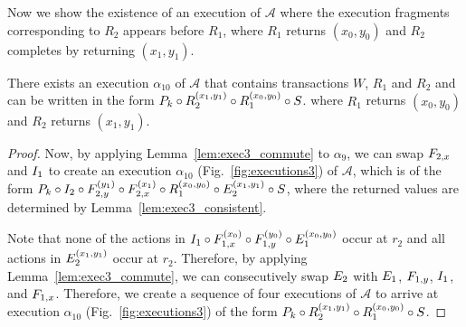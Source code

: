 
Now we show the existence of an execution of $\mathcal{A}$ where the execution fragments corresponding to $R_2$ appears 
before $R_1$, where  $R_1$ returns $(x_0, y_0)$ and $R_2$ completes by returning $(x_1, y_1)$.
\begin{lemma}   \label{lem:exec3_alpha11} 
\sloppy There exists an execution $\alpha_{10}$  of $\mathcal{A}$ that contains transactions $W$, $R_1$ and $R_2$
and   can be written in the form 
$\finiteprefixA{k-1}{k}   \circ
\frage{R_2}{}{x_1, y_1} \circ
 \frage{R_1}{}{x_0, y_0}
 \circ \fragt{S}{\alpha_{10}}{}$.
where $R_1$ returns $(x_0, y_0)$ and $R_2$ returns $(x_1, y_1)$.
\end{lemma}
\begin{proof}
Now, by applying Lemma~\ref{lem:exec3_commute} to $\alpha_{9}$, we can swap 
 $\fragt{F_{2,x}}{}{}$  and $ \fragt{I_1}{}{}$ to create an execution $\alpha_{10}$  (Fig.~\ref{fig:executions3}) of $\mathcal{A}$, which is
of the form 
$ \finiteprefixA{k-1}{k}   \circ 
\fragt{I_2}{\alpha_9}{} \circ \fragt{F_{2,y}}{\alpha_9}{y_1} 
\circ   \fragt{F_{2,x}}{\alpha_9}{x_1}  \circ 
\frage{R_1}{}{x_0, y_0} \circ \fragt{E_2}{\alpha_8}{x_1, y_1}
 \circ \fragt{S}{\alpha_9}{}$, where the returned values are determined by  Lemma~\ref{lem:exec3_consistent}.
 
Note that none of the actions in 
$\fragt{I_1}{\alpha_9}{} \circ \fragt{F_{1,x}}{\alpha_9}{x_0} 
 \circ \fragt{F_{1,y}}{\alpha_9}{y_0} \circ \fragt{E_1}{\alpha_9}{x_0, y_0}$
occur at $r_2$ and all actions in $\fragt{E_2}{\alpha_9}{x_1, y_1} $ occur at $r_2$. Therefore, by 
applying Lemma~\ref{lem:exec3_commute}, we can consecutively swap $\fragt{E_2}{}{}$ with 
%
$\fragt{E_1}{}{}$, $\fragt{F_{1,y}}{}{}$,  $\fragt{I_1}{}{}$,  and $\fragt{F_{1,x}}{}{}$. Therefore, we create a sequence of 
four executions of $\mathcal{A}$ to arrive at execution $\alpha_{10}$ (Fig.~\ref{fig:executions3}) of the form
$\finiteprefixA{k-1}{k}   \circ
\frage{R_2}{}{x_1, y_1}
 \circ
 \frage{R_1}{}{x_0, y_0}
 \circ \fragt{S}{\alpha_{10}}{}$.
\end{proof}

